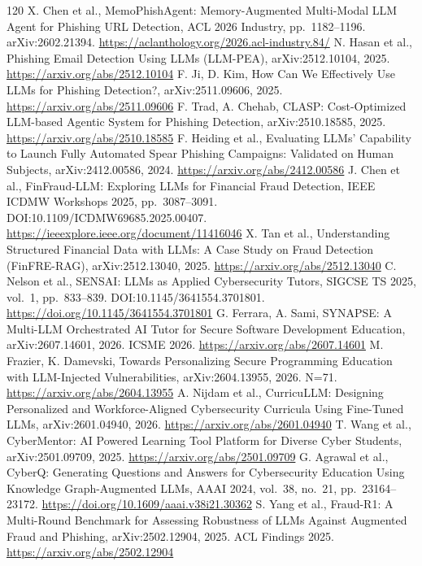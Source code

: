 \documentclass[11pt,a4paper]{article}
\begin{document}
\begin{thebibliography}{120}
 X. Chen et al., MemoPhishAgent: Memory-Augmented Multi-Modal LLM Agent for Phishing URL Detection, ACL 2026 Industry, pp.~1182--1196. arXiv:2602.21394. \url{https://aclanthology.org/2026.acl-industry.84/}
 N. Hasan et al., Phishing Email Detection Using LLMs (LLM-PEA), arXiv:2512.10104, 2025. \url{https://arxiv.org/abs/2512.10104}
 F. Ji, D. Kim, How Can We Effectively Use LLMs for Phishing Detection?, arXiv:2511.09606, 2025. \url{https://arxiv.org/abs/2511.09606}
 F. Trad, A. Chehab, CLASP: Cost-Optimized LLM-based Agentic System for Phishing Detection, arXiv:2510.18585, 2025. \url{https://arxiv.org/abs/2510.18585}
 F. Heiding et al., Evaluating LLMs' Capability to Launch Fully Automated Spear Phishing Campaigns: Validated on Human Subjects, arXiv:2412.00586, 2024. \url{https://arxiv.org/abs/2412.00586}
 J. Chen et al., FinFraud-LLM: Exploring LLMs for Financial Fraud Detection, IEEE ICDMW Workshops 2025, pp.~3087--3091. DOI:10.1109/ICDMW69685.2025.00407. \url{https://ieeexplore.ieee.org/document/11416046}
 X. Tan et al., Understanding Structured Financial Data with LLMs: A Case Study on Fraud Detection (FinFRE-RAG), arXiv:2512.13040, 2025. \url{https://arxiv.org/abs/2512.13040}
 C. Nelson et al., SENSAI: LLMs as Applied Cybersecurity Tutors, SIGCSE TS 2025, vol.~1, pp.~833--839. DOI:10.1145/3641554.3701801. \url{https://doi.org/10.1145/3641554.3701801}
 G. Ferrara, A. Sami, SYNAPSE: A Multi-LLM Orchestrated AI Tutor for Secure Software Development Education, arXiv:2607.14601, 2026. ICSME 2026. \url{https://arxiv.org/abs/2607.14601}
 M. Frazier, K. Damevski, Towards Personalizing Secure Programming Education with LLM-Injected Vulnerabilities, arXiv:2604.13955, 2026. N=71. \url{https://arxiv.org/abs/2604.13955}
 A. Nijdam et al., CurricuLLM: Designing Personalized and Workforce-Aligned Cybersecurity Curricula Using Fine-Tuned LLMs, arXiv:2601.04940, 2026. \url{https://arxiv.org/abs/2601.04940}
 T. Wang et al., CyberMentor: AI Powered Learning Tool Platform for Diverse Cyber Students, arXiv:2501.09709, 2025. \url{https://arxiv.org/abs/2501.09709}
 G. Agrawal et al., CyberQ: Generating Questions and Answers for Cybersecurity Education Using Knowledge Graph-Augmented LLMs, AAAI 2024, vol.~38, no.~21, pp.~23164--23172. \url{https://doi.org/10.1609/aaai.v38i21.30362}
 S. Yang et al., Fraud-R1: A Multi-Round Benchmark for Assessing Robustness of LLMs Against Augmented Fraud and Phishing, arXiv:2502.12904, 2025. ACL Findings 2025. \url{https://arxiv.org/abs/2502.12904}

\end{thebibliography}
\end{document}
